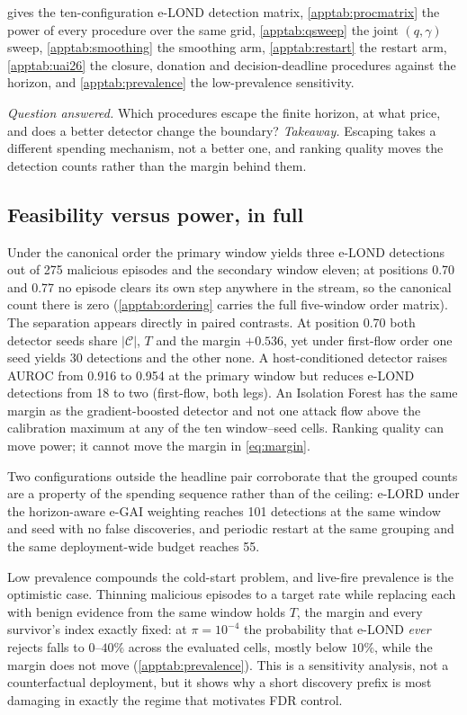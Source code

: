 \documentclass[conference]{IEEEtran}
\newcommand{\Cal}{\mathcal{C}}
\newcommand{\nCal}{\lvert\Cal\rvert}
\begin{document}
 gives the ten-configuration e-LOND detection matrix, \cref{apptab:procmatrix} the
power of every procedure over the same grid, \cref{apptab:qsweep} the joint $(q,\gamma)$ sweep,
\cref{apptab:smoothing} the smoothing arm, \cref{apptab:restart} the restart arm,
\cref{apptab:uai26} the closure, donation and decision-deadline procedures against the horizon, and
\cref{apptab:prevalence} the low-prevalence sensitivity.

\emph{Question answered.} Which procedures escape the finite horizon, at what price, and does a better
detector change the boundary? \emph{Takeaway.} Escaping takes a different spending mechanism, not a
better one, and ranking quality moves the detection counts rather than the margin behind them.

\subsection{Feasibility versus power, in full}\label{app:feasnotpower}

Under the canonical order the primary window yields three e-LOND detections out of 275 malicious
episodes and the secondary window eleven; at positions 0.70 and 0.77 no episode clears its own step
anywhere in the stream, so the canonical count there is zero (\cref{apptab:ordering} carries the full
five-window order matrix). The separation appears directly in paired contrasts. At position 0.70 both
detector seeds share $\nCal$, $T$ and the margin $+0.536$, yet under first-flow order one seed yields 30
detections and the other none. A host-conditioned detector raises AUROC from 0.916 to 0.954 at the
primary window but reduces e-LOND detections from 18 to two (first-flow, both legs). An Isolation Forest
has the same margin as the gradient-boosted detector and not one attack flow above the calibration
maximum at any of the ten window--seed cells. Ranking quality can move power; it cannot move the margin
in \eqref{eq:margin}.

Two configurations outside the headline pair corroborate that the grouped counts are a property of the
spending sequence rather than of the ceiling: e-LORD under the horizon-aware e-GAI weighting reaches 101
detections at the same window and seed with no false discoveries, and periodic restart at the same
grouping and the same deployment-wide budget reaches 55.

Low prevalence compounds the cold-start problem, and live-fire prevalence is the optimistic case.
Thinning malicious episodes to a target rate while replacing each with benign evidence from the same
window holds $T$, the margin and every survivor's index exactly fixed: at $\pi=10^{-4}$ the probability
that e-LOND \emph{ever} rejects falls to $0$--$40\%$ across the evaluated cells, mostly below $10\%$,
while the margin does not move (\cref{apptab:prevalence}). This is a sensitivity analysis, not a
counterfactual deployment, but it shows why a short discovery prefix is most damaging in exactly the
regime that motivates FDR control.
\end{document}

